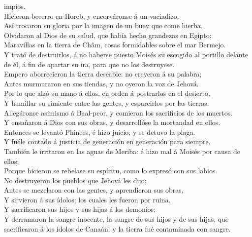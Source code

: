 impíos.\\
 Hicieron becerro en Horeb, y encorváronse á un
vaciadizo.\\
 Así trocaron su gloria por la imagen de un buey que come
hierba.\\
 Olvidaron al Dios de su salud, que había hecho grandezas
en Egipto;\\
 Maravillas en la tierra de Châm, cosas formidables sobre
el mar Bermejo.\\
 Y trató de destruirlos, á no haberse puesto Moisés su
escogido al portillo delante de él, á fin de apartar su ira, para que no
los destruyese.\\
 Empero aborrecieron la tierra deseable: no creyeron á su
palabra;\\
 Antes murmuraron en sus tiendas, y no oyeron la voz de
Jehová.\\
 Por lo que alzó su mano á ellos, en orden á postrarlos en
el desierto,\\
 Y humillar su simiente entre las gentes, y esparcirlos por
las tierras.\\
 Allegáronse asimismo á Baal-peor, y comieron los
sacrificios de los muertos.\\
 Y ensañaron á Dios con sus obras, y desarrollóse la
mortandad en ellos.\\
 Entonces se levantó Phinees, é hizo juicio; y se detuvo la
plaga.\\
 Y fuéle contado á justicia de generación en generación
para siempre.\\
 También le irritaron en las aguas de Meriba: é hizo mal á
Moisés por causa de ellos;\\
 Porque hicieron se rebelase su espíritu, como lo expresó
con sus labios.\\
 No destruyeron los pueblos que Jehová les dijo;\\
 Antes se mezclaron con las gentes, y aprendieron sus
obras,\\
 Y sirvieron á sus ídolos; los cuales les fueron por
ruina.\\
 Y sacrificaron sus hijos y sus hijas á los demonios;\\
 Y derramaron la sangre inocente, la sangre de sus hijos y
de sus hijas, que sacrificaron á los ídolos de Canaán: y la tierra fué
contaminada con sangre.\\
